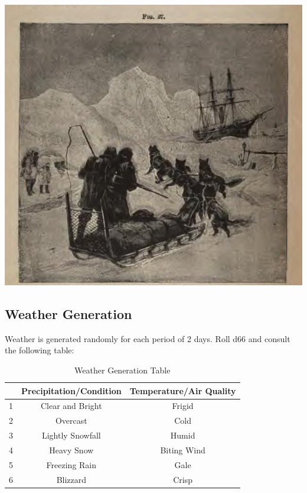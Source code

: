 \documentclass[notitlepage]{article}
\begin{document}
\begin{multicols}{2}
{\centering
\includegraphics[width=\columnwidth]{arctic-sledders}
}

\subsection*{Weather Generation}

Weather is generated randomly for each period of 2 days. Roll d66 and consult the following table:

\begin{table}[h]
  \centering
  \begin{tabular}{| c || c || c ||}
    \hline
    & Precipitation/Condition & Temperature/Air Quality \\ \hline
    1 & Clear and Bright & Frigid \\
    2 & Overcast & Cold \\
    3 & Lightly Snowfall & Humid \\
    4 & Heavy Snow & Biting Wind \\
    5 & Freezing Rain & Gale \\
    6 & Blizzard & Crisp  \\ \hline
  \end{tabular} \label{tbl:weather}
  \caption{Weather Generation Table}
  \label{tbl:weather}
\end{table}  


\end{multicols}
\end{document}
